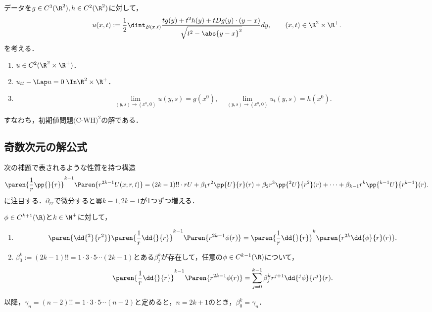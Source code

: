\documentclass[uplatex,dvipdfmx]{jsreport}
\begin{document}
\begin{theorem}
    データを$g\in C^3(\R^2),h\in C^2(\R^2)$に対して，
    \[u(x,t):=\frac{1}{2}\dint_{B(x,t)}\frac{tg(y)+t^2h(y)+tDg(y)\cdot(y-x)}{\sqrt{t^2-\abs{y-x}^2}}dy,\qquad(x,t)\in\R^2\times\R^+.\]
    を考える．
    \begin{enumerate}
        \item $u\in C^2(\R^2\times\R^+)$．
        \item $u_{tt}-\Lap u=0\;\In\R^2\times\R^+$．
        \item \[\lim_{(y,s)\to(x^0,0)}u(y,s)=g(x^0),\quad\lim_{(y,s)\to(x^0,0)}u_t(y,s)=h(x^0).\]
    \end{enumerate}
    すなわち，初期値問題$\text{(C-WH)}^2$の解である．
\end{theorem}

\subsection{奇数次元の解公式}

\begin{tcolorbox}[colframe=ForestGreen, colback=ForestGreen!10!white,breakable,colbacktitle=ForestGreen!40!white,coltitle=black,fonttitle=\bfseries\sffamily,
title=]
    次の補題で表されるような性質を持つ構造
    \[\paren{\frac{1}{r}\pp{}{r}}^{k-1}\Paren{r^{2k-1}U(x;r,t)}=(2k-1)!!\cdot rU+\beta_1r^2\pp{U}{r}(r)+\beta_2r^3\pp{^2U}{r^2}(r)+\cdots+\beta_{k-1}r^{k}\pp{^{k-1}U}{r^{k-1}}(r).\]
    に注目する．$\partial_{rr}$で微分すると冪$k-1,2k-1$が1つずつ増える．
\end{tcolorbox}

\begin{lemma}\label{lemma-structure-for-odd-dimension-WE}
    $\phi\in C^{k+1}(\R)$と$k\in\N^+$に対して，
    \begin{enumerate}
        \item \[\paren{\dd{^2}{r^2}}\paren{\frac{1}{r}\dd{}{r}}^{k-1}\Paren{r^{2k-1}\phi(r)}=\paren{\frac{1}{r}\dd{}{r}}^k\paren{r^{2k}\dd{\phi}{r}(r)}.\]
        \item $\beta^k_0:=(2k-1)!!=1\cdot3\cdot5\cdots(2k-1)$とある$\beta_j^k$が存在して，任意の$\phi\in C^{k-1}(\R)$について，
        \[\paren{\frac{1}{r}\dd{}{r}}^{k-1}\Paren{r^{2k-1}\phi(r)}=\sum_{j=0}^{k-1}\beta_j^kr^{j+1}\dd{^j\phi}{r^j}(r).\]
    \end{enumerate}
    以降，$\gamma_n=(n-2)!!=1\cdot3\cdot5\cdots(n-2)$と定めると，$n=2k+1$のとき，$\beta^k_0=\gamma_n$．
\end{lemma}
\end{document}
